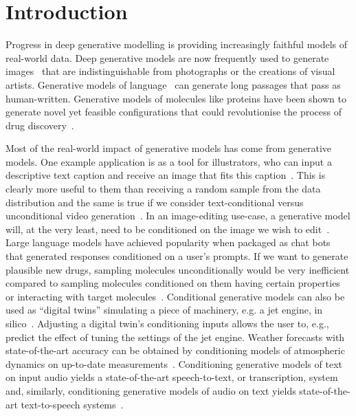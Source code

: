 \chapter{Introduction}
\label{ch:introduction}

Progress in deep generative modelling is providing increasingly faithful models of real-world data. Deep generative models are now frequently used to generate images~\citep{rombach2022high,ho2022imagen} that are indistinguishable from photographs or the creations of visual artists. Generative models of language~\cite{wolf2020transformers} can generate long passages that pass as human-written. Generative models of molecules like proteins have been shown to generate novel yet feasible configurations that could revolutionise the process of drug discovery~\citep{hoogeboom2022equivariant,watson2022broadly}. 

Most of the real-world impact of generative models has come from  generative models. 
One example application is as a tool for illustrators, who can input a descriptive text caption and receive an image that fits this caption~\citep{rombach2022high,ho2022imagen}. This is clearly more useful to them than receiving a random sample from the data distribution and the same is true if we consider text-conditional versus unconditional video generation~\citep{ho2022video}. In an image-editing use-case, a generative model will, at the very least, need to be conditioned on the image we wish to edit~\citep{rombach2022high,sheynin2023emu}. Large language models have achieved popularity when packaged as chat bots~\cite{wolf2020transformers} that generated responses conditioned on a user's prompts. If we want to generate plausible new drugs, sampling molecules unconditionally would be very inefficient compared to sampling molecules conditioned on them having certain properties or interacting with target molecules~\citep{watson2022broadly}. Conditional generative models can also be used as ``digital twins'' simulating a piece of machinery, e.g. a jet engine, in silico~\citep{munk2022probabilistic,fuller2020digital}. Adjusting a digital twin's conditioning inputs allows the user to, e.g., predict the effect of tuning the settings of the jet engine. Weather forecasts with state-of-the-art accuracy can be obtained by conditioning models of atmospheric dynamics on up-to-date measurements~\citep{lam2022graphcast}. Conditioning generative models of text on input audio yields a state-of-the-art speech-to-text, or transcription, system~\citep{radford2023robust} and, similarly, conditioning generative models of audio on text yields state-of-the-art text-to-speech systems~\citep{tan2024naturalspeech}.


